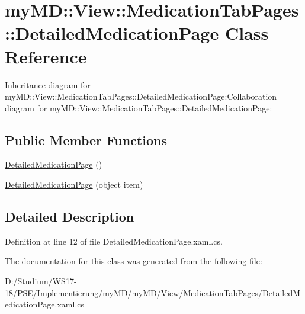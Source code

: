 \hypertarget{classmy_m_d_1_1_view_1_1_medication_tab_pages_1_1_detailed_medication_page}{
\section{my\-MD::View::Medication\-Tab\-Pages::Detailed\-Medication\-Page Class Reference}
\label{d3/d67/classmy_m_d_1_1_view_1_1_medication_tab_pages_1_1_detailed_medication_page}
}
Inheritance diagram for my\-MD::View::Medication\-Tab\-Pages::Detailed\-Medication\-Page:Collaboration diagram for my\-MD::View::Medication\-Tab\-Pages::Detailed\-Medication\-Page:\subsection*{Public Member Functions}
\begin{CompactItemize}
\item 
\hypertarget{classmy_m_d_1_1_view_1_1_medication_tab_pages_1_1_detailed_medication_page_213d1f09bc5a243476fb4bd4150c7a70}{
\hyperlink{classmy_m_d_1_1_view_1_1_medication_tab_pages_1_1_detailed_medication_page_213d1f09bc5a243476fb4bd4150c7a70}{Detailed\-Medication\-Page} ()}
\label{d3/d67/classmy_m_d_1_1_view_1_1_medication_tab_pages_1_1_detailed_medication_page_213d1f09bc5a243476fb4bd4150c7a70}

\item 
\hypertarget{classmy_m_d_1_1_view_1_1_medication_tab_pages_1_1_detailed_medication_page_0782532b7e5915826d4e14bbfffa5fbd}{
\hyperlink{classmy_m_d_1_1_view_1_1_medication_tab_pages_1_1_detailed_medication_page_0782532b7e5915826d4e14bbfffa5fbd}{Detailed\-Medication\-Page} (object item)}
\label{d3/d67/classmy_m_d_1_1_view_1_1_medication_tab_pages_1_1_detailed_medication_page_0782532b7e5915826d4e14bbfffa5fbd}

\end{CompactItemize}


\subsection{Detailed Description}




Definition at line 12 of file Detailed\-Medication\-Page.xaml.cs.

The documentation for this class was generated from the following file:\begin{CompactItemize}
\item 
D:/Studium/WS17-18/PSE/Implementierung/my\-MD/my\-MD/View/Medication\-Tab\-Pages/Detailed\-Medication\-Page.xaml.cs\end{CompactItemize}
